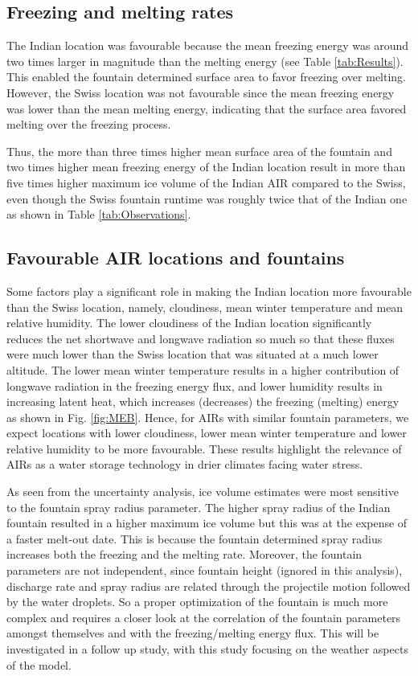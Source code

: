 \documentclass[utf8]{frontiersSCNS} %
\begin{document}
\subsection{Freezing and melting rates}

The Indian location was favourable because the mean freezing energy was around two times larger in magnitude than the
melting energy (see Table \ref{tab:Results}). This enabled the fountain determined surface area to favor freezing over melting. However, the
Swiss location was not favourable since the mean freezing energy was lower than the mean melting energy, indicating that the
surface area favored melting over the freezing process.

Thus, the more than three times higher mean surface area of the fountain and two times higher mean freezing energy of the Indian
location result in more than five times higher maximum ice volume of the Indian AIR compared to the Swiss, even though the Swiss
fountain runtime was roughly twice that of the Indian one as shown in Table \ref{tab:Observations}.

\subsection{Favourable AIR locations and fountains}

Some factors play a significant role in making the Indian location more favourable than the Swiss location, namely,
cloudiness, mean winter temperature and mean relative humidity. The lower cloudiness of the Indian location
significantly reduces the net shortwave and longwave radiation so much so that these fluxes were much lower
than the Swiss location that was situated at a much lower altitude. The lower mean winter temperature results in a
higher contribution of longwave radiation in the freezing energy flux, and lower humidity results in increasing
latent heat, which increases (decreases) the freezing (melting) energy as shown in Fig. \ref{fig:MEB}.  Hence, for
AIRs with similar fountain parameters, we expect locations with lower cloudiness, lower mean winter temperature and
lower relative humidity to be more favourable. These results highlight the relevance of AIRs as a water storage
technology in drier climates facing water stress.

As seen from the uncertainty analysis, ice volume estimates were most sensitive to the fountain spray radius
parameter. The higher spray radius of the Indian fountain resulted in a higher maximum ice volume but this was at
the expense of a faster melt-out date. This is because the fountain determined spray radius increases both the
freezing and the melting rate. Moreover, the fountain parameters are not independent, since fountain height
(ignored in this analysis), discharge rate and spray radius are related through the projectile motion followed by
the water droplets. So a proper optimization of the fountain is much more complex and requires a closer look at the
correlation of the fountain parameters amongst themselves and with the freezing/melting energy flux. This will be
investigated in a follow up study, with this study focusing on the weather aspects of the model.
\end{document}
